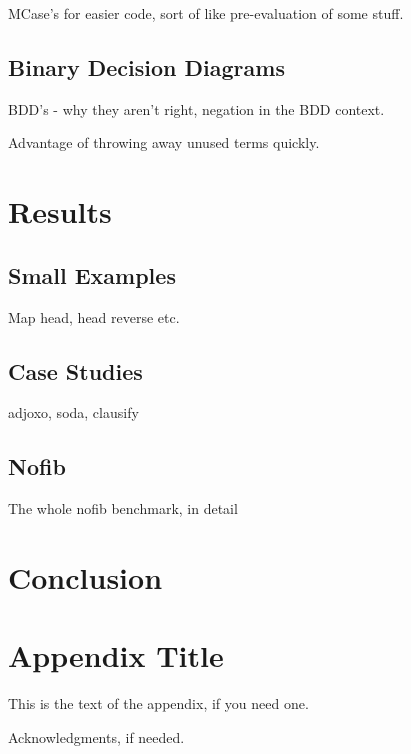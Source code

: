 \documentclass[preprint]{sigplanconf}
\begin{document}
MCase's for easier code, sort of like pre-evaluation of some stuff.

\subsection{Binary Decision Diagrams}

BDD's - why they aren't right, negation in the BDD context.

Advantage of throwing away unused terms quickly.

\section{Results}
\label{chap:results}

\subsection{Small Examples}

Map head, head reverse etc.


\subsection{Case Studies}

adjoxo, soda, clausify

\subsection{Nofib}

The whole nofib benchmark, in detail

\section{Conclusion}
\label{chap:conc}






\appendix
\section{Appendix Title}

This is the text of the appendix, if you need one.

\acks

Acknowledgments, if needed.



\end{document}
